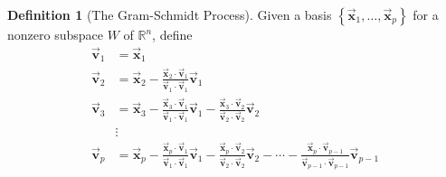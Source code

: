 \documentclass[letter,11pt]{article}
\theoremstyle{definition}
\newtheorem{definition}{Definition}[section]
\begin{document}
\begin{tcolorbox}[boxrule=1mm,enhanced jigsaw, breakable,before=\hfill,after=\hfill,adjusted title={Problem 5 solutions}]
  \begin{definition}[The Gram-Schmidt Process]
      Given a basis $\left\{\vec{\boldsymbol{x}}_1, \ldots, \vec{\boldsymbol{x}}_p\right\}$ for a nonzero subspace $W$ of $\mathbb{R}^n$, define
\begin{align*}
\vec{\boldsymbol{v}}_1 & =\vec{\boldsymbol{x}}_1 \\
\vec{\boldsymbol{v}}_2 & =\vec{\boldsymbol{x}}_2-\frac{\vec{\boldsymbol{x}}_2 \cdot \vec{\boldsymbol{v}}_1}{\vec{\boldsymbol{v}}_1 \cdot \vec{\boldsymbol{v}}_1} \vec{\boldsymbol{v}}_1 \\
\vec{\boldsymbol{v}}_3 & =\vec{\boldsymbol{x}}_3-\frac{\vec{\boldsymbol{x}}_3 \cdot \vec{\boldsymbol{v}}_1}{\vec{\boldsymbol{v}}_1 \cdot \vec{\boldsymbol{v}}_1} \vec{\boldsymbol{v}}_1-\frac{\vec{\boldsymbol{x}}_3 \cdot \vec{\boldsymbol{v}}_2}{\vec{\boldsymbol{v}}_2 \cdot \vec{\boldsymbol{v}}_2} \vec{\boldsymbol{v}}_2 \\
& \vdots \\
\vec{\boldsymbol{v}}_p & =\vec{\boldsymbol{x}}_p-\frac{\vec{\boldsymbol{x}}_p \cdot \vec{\boldsymbol{v}}_1}{\vec{\boldsymbol{v}}_1 \cdot \vec{\boldsymbol{v}}_1} \vec{\boldsymbol{v}}_1-\frac{\vec{\boldsymbol{x}}_p \cdot \vec{\boldsymbol{v}}_2}{\vec{\boldsymbol{v}}_2 \cdot \vec{\boldsymbol{v}}_2} \vec{\boldsymbol{v}}_2-\cdots-\frac{\vec{\boldsymbol{x}}_p \cdot \vec{\boldsymbol{v}}_{p-1}}{\vec{\boldsymbol{v}}_{p-1} \cdot \vec{\boldsymbol{v}}_{p-1}} \vec{\boldsymbol{v}}_{p-1}
\end{align*}


\end{definition}
\end{tcolorbox}
\end{document}

